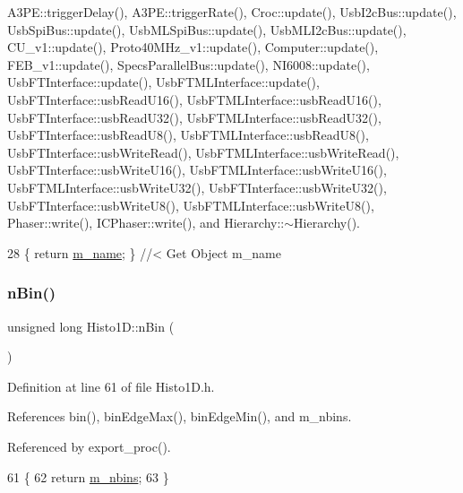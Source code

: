A3\+P\+E\+::trigger\+Delay(), A3\+P\+E\+::trigger\+Rate(), Croc\+::update(), Usb\+I2c\+Bus\+::update(), Usb\+Spi\+Bus\+::update(), Usb\+M\+L\+Spi\+Bus\+::update(), Usb\+M\+L\+I2c\+Bus\+::update(), C\+U\+\_\+v1\+::update(), Proto40\+M\+Hz\+\_\+v1\+::update(), Computer\+::update(), F\+E\+B\+\_\+v1\+::update(), Specs\+Parallel\+Bus\+::update(), N\+I6008\+::update(), Usb\+F\+T\+Interface\+::update(), Usb\+F\+T\+M\+L\+Interface\+::update(), Usb\+F\+T\+Interface\+::usb\+Read\+U16(), Usb\+F\+T\+M\+L\+Interface\+::usb\+Read\+U16(), Usb\+F\+T\+Interface\+::usb\+Read\+U32(), Usb\+F\+T\+M\+L\+Interface\+::usb\+Read\+U32(), Usb\+F\+T\+Interface\+::usb\+Read\+U8(), Usb\+F\+T\+M\+L\+Interface\+::usb\+Read\+U8(), Usb\+F\+T\+Interface\+::usb\+Write\+Read(), Usb\+F\+T\+M\+L\+Interface\+::usb\+Write\+Read(), Usb\+F\+T\+Interface\+::usb\+Write\+U16(), Usb\+F\+T\+M\+L\+Interface\+::usb\+Write\+U16(), Usb\+F\+T\+M\+L\+Interface\+::usb\+Write\+U32(), Usb\+F\+T\+Interface\+::usb\+Write\+U32(), Usb\+F\+T\+Interface\+::usb\+Write\+U8(), Usb\+F\+T\+M\+L\+Interface\+::usb\+Write\+U8(), Phaser\+::write(), I\+C\+Phaser\+::write(), and Hierarchy\+::$\sim$\+Hierarchy().


\begin{DoxyCode}
28 \{ \textcolor{keywordflow}{return} \hyperlink{classObject_a8b83c95c705d2c3ba0d081fe1710f48d}{m\_name}; \} \textcolor{comment}{//< Get Object m\_name}
\end{DoxyCode}
\mbox{\label{classHisto1D_a7f3cf7364ae6e1eb9ba08b5ffe897d8f}} 
\subsubsection{\texorpdfstring{n\+Bin()}{nBin()}}
{\footnotesize\ttfamily unsigned long Histo1\+D\+::n\+Bin (\begin{DoxyParamCaption}{ }\end{DoxyParamCaption})\hspace{0.3cm}{\ttfamily [inline]}}



Definition at line 61 of file Histo1\+D.\+h.



References bin(), bin\+Edge\+Max(), bin\+Edge\+Min(), and m\+\_\+nbins.



Referenced by export\+\_\+proc().


\begin{DoxyCode}
61                       \{
62     \textcolor{keywordflow}{return} \hyperlink{classHisto1D_a1913aca9a278b4bfd365f35b85e65d8d}{m\_nbins};
63   \}
\end{DoxyCode}
\mbox{\label{classHisto1D_a5d13018047a4ffb15e662f44a0a3f520}} 
